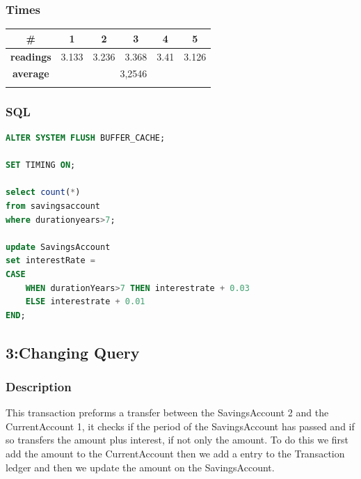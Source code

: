 \documentclass[a4paper, 10pt]{article}
\begin{document}
\subsubsection{Times}
\begin{table}[H]
\centering
\begin{tabular}{cccccc}
\hline
\multicolumn{1}{|c|}{\textbf{\#}}       & \multicolumn{1}{c|}{\textbf{1}} & \multicolumn{1}{c|}{\textbf{2}} & \multicolumn{1}{c|}{\textbf{3}} & \multicolumn{1}{c|}{\textbf{4}} & \multicolumn{1}{c|}{\textbf{5}} \\ \hline
\multicolumn{1}{|c|}{\textbf{readings}} & \multicolumn{1}{c|}{3.133}           & \multicolumn{1}{c|}{3.236}           & \multicolumn{1}{c|}{3.368}           & \multicolumn{1}{c|}{3.41}           & \multicolumn{1}{c|}{3.126}           \\ \hline
\multicolumn{1}{|c|}{\textbf{average}}      & \multicolumn{5}{c|}{3,2546}                                                                                                                                                   \\ \hline
\textbf{}                               & \textbf{}                       & \textbf{}                       & \textbf{}                       & \textbf{}                       & \textbf{}                      
\end{tabular}
\end{table}
\subsubsection{SQL}
\begin{lstlisting}[language=SQL]
ALTER SYSTEM FLUSH BUFFER_CACHE;

SET TIMING ON;

select count(*) 
from savingsaccount
where durationyears>7;

update SavingsAccount
set interestRate =
CASE 
    WHEN durationYears>7 THEN interestrate + 0.03
    ELSE interestrate + 0.01
END;
\end{lstlisting}

\subsection{3:Changing Query}
\subsubsection{Description}
This transaction preforms a transfer between the SavingsAccount 2 and the CurrentAccount 1, it checks if the period of the SavingsAccount has passed and if so transfers the amount plus interest, if not only the amount. To do this we first add the amount to the CurrentAccount then we add a entry to the Transaction ledger and then we update the amount on the SavingsAccount.
\end{document}
